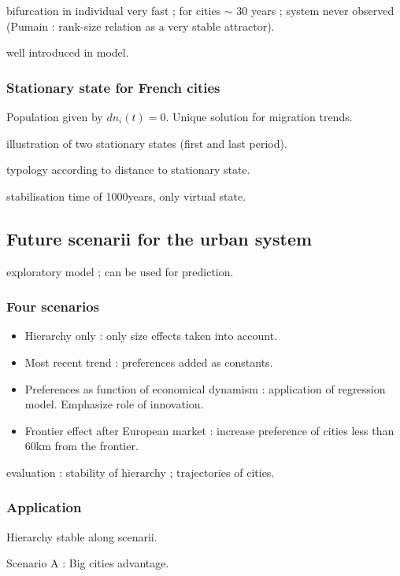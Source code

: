 bifurcation in individual very fast ; for cities $\sim$ 30 years ; system never observed (Pumain : rank-size relation as a very stable attractor).

well introduced in model.

\subsubsection{Stationary state for French cities}

Population given by $dn_i(t) = 0$. Unique solution for migration trends.

illustration of two stationary states (first and last period).

typology according to distance to stationary state.

stabilisation time of 1000years, only virtual state.

\subsection{Future scenarii for the urban system}

exploratory model ; can be used for prediction.

\subsubsection{Four scenarios}

\begin{itemize}
\item Hierarchy only : only size effects taken into account.
\item Most recent trend : preferences added as constants.
\item Preferences as function of economical dynamism : application of regression model. Emphasize role of innovation.
\item Frontier effect after European market : increase preference of cities less than 60km from the frontier. 
\end{itemize}

evaluation : stability of hierarchy ; trajectories of cities.

\subsubsection{Application}

Hierarchy stable along scenarii.

Scenario A : Big cities advantage.

